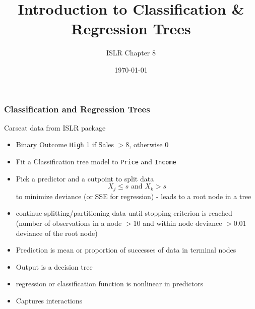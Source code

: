\documentclass[handout]{beamer}\usepackage[]{graphicx}\usepackage[]{color}
\title{Introduction to Classification \& Regression Trees}
\author{ISLR Chapter 8 }
\date{\today}
\makeatletter
\newcommand{\hlnum}[1]{\textcolor[rgb]{0.686,0.059,0.569}{#1}}%
\newcommand{\hlstr}[1]{\textcolor[rgb]{0.192,0.494,0.8}{#1}}%
\newcommand{\hlopt}[1]{\textcolor[rgb]{0,0,0}{#1}}%
\newcommand{\hlstd}[1]{\textcolor[rgb]{0.345,0.345,0.345}{#1}}%
\newcommand{\hlkwb}[1]{\textcolor[rgb]{0.69,0.353,0.396}{#1}}%
\newcommand{\hlkwc}[1]{\textcolor[rgb]{0.333,0.667,0.333}{#1}}%
\newcommand{\hlkwd}[1]{\textcolor[rgb]{0.737,0.353,0.396}{\textbf{#1}}}%
\newenvironment{kframe}{%
 \def\at@end@of@kframe{}%
 \ifinner\ifhmode%
  \def\at@end@of@kframe{\end{minipage}}%
  \begin{minipage}{\columnwidth}%
 \fi\fi%
 \def\FrameCommand##1{\hskip\@totalleftmargin \hskip-\fboxsep
 \colorbox{shadecolor}{##1}\hskip-\fboxsep
     \hskip-\linewidth \hskip-\@totalleftmargin \hskip\columnwidth}%
 \MakeFramed {\advance\hsize-\width
   \@totalleftmargin\z@ \linewidth\hsize
   \@setminipage}}%
 {\par\unskip\endMakeFramed%
 \at@end@of@kframe}
\newenvironment{knitrout}{}{} %
\makeatother
\begin{document}
\maketitle
\begin{frame}[fragile]\frametitle{Classification and Regression Trees}

Carseat data from ISLR package \pause

\begin{itemize}
\item Binary Outcome {\tt High} 1 if Sales $ > 8$, otherwise  0 \pause
\item Fit a Classification tree model to {\tt Price} and {\tt Income} \pause
\item Pick a predictor  and a cutpoint to split data
$$  X_j \le s  \text{ and } X_k > s$$
to minimize deviance (or SSE for regression) - leads to a  root node in a tree  \pause
\item continue  splitting/partitioning data until stopping criterion is reached  (number of observations in a node $ > 10$ and within node deviance $ > 0.01$ deviance of the root node) \pause
\item  Prediction is mean or proportion of
  successes of data in terminal nodes \pause
\item Output is a decision tree \pause
\item regression or classification function is nonlinear in predictors \pause
\item Captures interactions
\end{itemize}

\end{frame}



\end{document}
